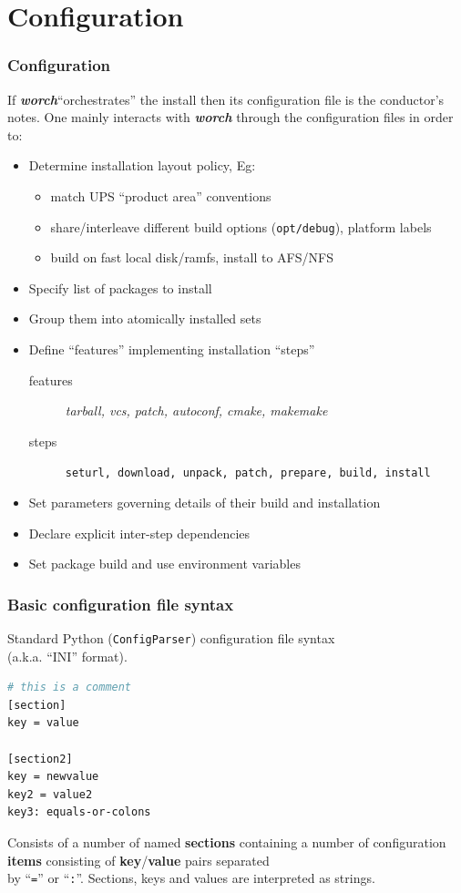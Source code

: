 \documentclass[xcolor=dvipsnames]{beamer}
\newcommand{\app}[1]{\textbf{\textit{#1}}\xspace}
\def\worch{\app{worch}}
\begin{document}
\section{Configuration}

\begin{frame}
  \frametitle{Configuration} 

  If \worch ``orchestrates'' the install then its configuration file
  is the conductor's notes.  One mainly interacts with \worch through
  the configuration files in order to:
  \begin{itemize}
  \item Determine installation layout policy, Eg:
    \begin{itemize}
    \item match UPS ``product area'' conventions
    \item share/interleave different build options (\texttt{opt/debug}), platform labels
    \item build on fast local disk/ramfs, install to AFS/NFS
    \end{itemize}
  \item Specify list of packages to install
  \item Group them into atomically installed sets
  \item Define ``features'' implementing installation ``steps''
    \begin{description}
    \item [features] \textit{tarball, vcs, patch, autoconf, cmake, makemake}
    \item [steps] \texttt{seturl, download, unpack, patch, prepare, build, install}
    \end{description}
  \item Set parameters governing details of their build and installation
  \item Declare explicit inter-step dependencies
  \item Set package build and use environment variables
  \end{itemize}
\end{frame}

\begin{frame}[fragile]
  \frametitle{Basic configuration file syntax}

  Standard Python (\texttt{ConfigParser}) configuration file syntax \\
  (a.k.a. ``INI'' format).

  \begin{lstlisting}[language=bash,emph={section,section2}]
# this is a comment
[section]
key = value

[section2]
key = newvalue
key2 = value2
key3: equals-or-colons
  \end{lstlisting}

  Consists of a number of named \textbf{sections} containing a number
  of configuration \textbf{items} consisting of
  \textbf{key}/\textbf{value} pairs separated \\
  by ``\texttt{=}'' or ``\texttt{:}''.   Sections, keys and values are interpreted as strings.

\end{frame}
\end{document}
